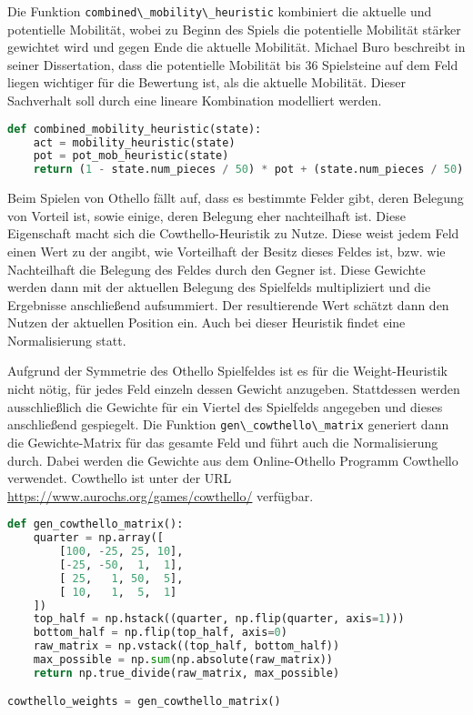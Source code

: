 Die Funktion \passthrough{\lstinline!combined\_mobility\_heuristic!}
kombiniert die aktuelle und potentielle Mobilität, wobei zu Beginn des
Spiels die potentielle Mobilität stärker gewichtet wird und gegen Ende
die aktuelle Mobilität. Michael Buro beschreibt in seiner Dissertation,
dass die potentielle Mobilität bis 36 Spielsteine auf dem Feld liegen
wichtiger für die Bewertung ist, als die aktuelle Mobilität. Dieser
Sachverhalt soll durch eine lineare Kombination modelliert werden.

\begin{lstlisting}[language=Python]
def combined_mobility_heuristic(state):
    act = mobility_heuristic(state)
    pot = pot_mob_heuristic(state)
    return (1 - state.num_pieces / 50) * pot + (state.num_pieces / 50) *  act
\end{lstlisting}

Beim Spielen von Othello fällt auf, dass es bestimmte Felder gibt, deren
Belegung von Vorteil ist, sowie einige, deren Belegung eher nachteilhaft
ist. Diese Eigenschaft macht sich die Cowthello-Heuristik zu Nutze.
Diese weist jedem Feld einen Wert zu der angibt, wie Vorteilhaft der
Besitz dieses Feldes ist, bzw. wie Nachteilhaft die Belegung des Feldes
durch den Gegner ist. Diese Gewichte werden dann mit der aktuellen
Belegung des Spielfelds multipliziert und die Ergebnisse anschließend
aufsummiert. Der resultierende Wert schätzt dann den Nutzen der
aktuellen Position ein. Auch bei dieser Heuristik findet eine
Normalisierung statt.

Aufgrund der Symmetrie des Othello Spielfeldes ist es für die
Weight-Heuristik nicht nötig, für jedes Feld einzeln dessen Gewicht
anzugeben. Stattdessen werden ausschließlich die Gewichte für ein
Viertel des Spielfelds angegeben und dieses anschließend gespiegelt. Die
Funktion \passthrough{\lstinline!gen\_cowthello\_matrix!} generiert dann
die Gewichte-Matrix für das gesamte Feld und führt auch die
Normalisierung durch. Dabei werden die Gewichte aus dem Online-Othello
Programm Cowthello verwendet. Cowthello ist unter der URL
\url{https://www.aurochs.org/games/cowthello/} verfügbar.

\begin{lstlisting}[language=Python]
def gen_cowthello_matrix():
    quarter = np.array([
        [100, -25, 25, 10],
        [-25, -50,  1,  1],
        [ 25,   1, 50,  5],
        [ 10,   1,  5,  1]
    ])
    top_half = np.hstack((quarter, np.flip(quarter, axis=1)))
    bottom_half = np.flip(top_half, axis=0)
    raw_matrix = np.vstack((top_half, bottom_half))
    max_possible = np.sum(np.absolute(raw_matrix))
    return np.true_divide(raw_matrix, max_possible)

cowthello_weights = gen_cowthello_matrix()
\end{lstlisting}

